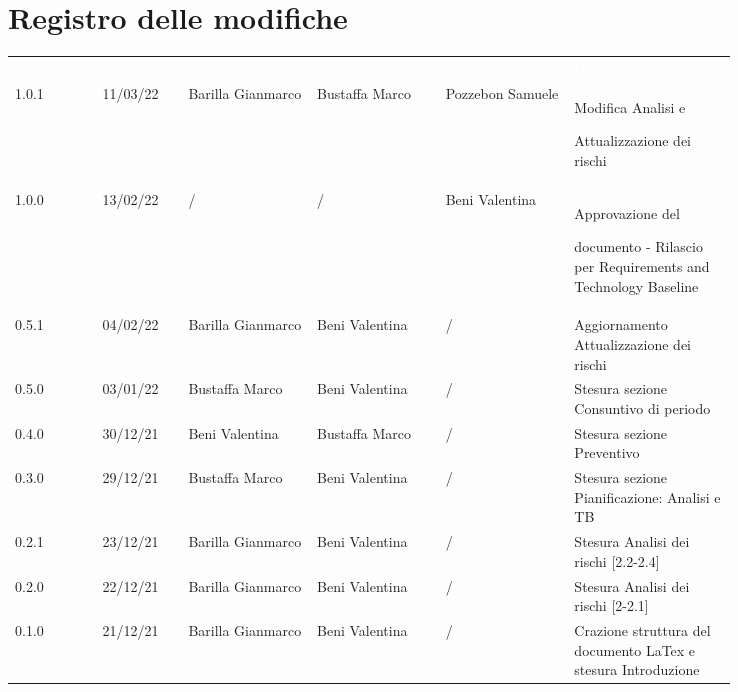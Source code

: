 \section*{Registro delle modifiche}

{\renewcommand{\arraystretch}{1.5}
\scriptsize
\begin{tabular}{p{0.10\linewidth}p{0.10\linewidth}p{0.15\linewidth}p{0.15\linewidth}p{0.15\linewidth}p{0.19\linewidth}}
	\rowcolor[RGB]{33, 73, 50}
	\textcolor{white}{\textbf{Versione}} & \textcolor{white}{\textbf{Data}} &
	\textcolor{white}{\textbf{Redattore}} & \textcolor{white}{\textbf{Verificatore}} &
	\textcolor{white}{\textbf{Approvatore}} & \textcolor{white}{\textbf{Descrizione}}\\
	\rowcolor[RGB]{216, 235, 171}
	1.0.1 & 11/03/22 & Barilla Gianmarco& Bustaffa Marco & Pozzebon Samuele & Modifica Analisi e\par Attualizzazione dei rischi\\
	\rowcolor[RGB]{233, 245, 206}
	1.0.0 & 13/02/22 & / & / & Beni Valentina & Approvazione del \par documento - Rilascio per Requirements and Technology Baseline\\
	\rowcolor[RGB]{216, 235, 171}
	0.5.1 & 04/02/22 & Barilla Gianmarco& Beni Valentina & / & Aggiornamento Attualizzazione dei rischi\\
	\rowcolor[RGB]{233, 245, 206}
	0.5.0 & 03/01/22 & Bustaffa Marco& Beni Valentina & / & Stesura sezione Consuntivo di periodo\\
	\rowcolor[RGB]{216, 235, 171}
	0.4.0 & 30/12/21 & Beni Valentina& Bustaffa Marco & / & Stesura sezione Preventivo\\
	\rowcolor[RGB]{233, 245, 206}
	0.3.0 & 29/12/21 & Bustaffa Marco& Beni Valentina & / & Stesura sezione Pianificazione: Analisi e TB\\
	\rowcolor[RGB]{216, 235, 171}
	0.2.1 & 23/12/21 & Barilla Gianmarco& Beni Valentina & / & Stesura Analisi dei rischi [2.2-2.4]\\
	\rowcolor[RGB]{233, 245, 206}
	0.2.0 & 22/12/21 & Barilla Gianmarco & Beni Valentina & / & Stesura Analisi dei rischi [2-2.1]\\
	\rowcolor[RGB]{216, 235, 171}
	0.1.0 & 21/12/21 & Barilla Gianmarco & Beni Valentina & / & Crazione struttura del documento LaTex e stesura Introduzione\\	
\end{tabular}	
}